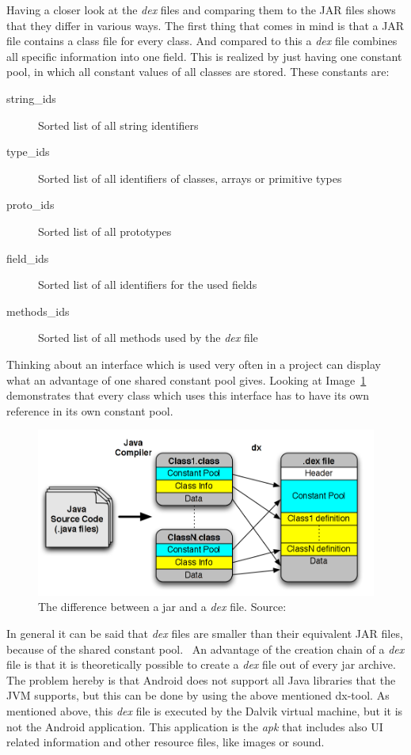 Having a closer look at the \textit{dex} files and comparing them to the JAR files shows that they differ in various ways.
The first thing that comes in mind is that a JAR file contains a class file for every class.
And compared to this a \textit{dex} file combines all specific information into one field.
This is realized by just having one constant pool, in which all constant values of all classes are stored.
These constants are:
\begin{description}
  \item[string\_ids] Sorted list of all string identifiers
  \item[type\_ids] Sorted list of all identifiers of classes, arrays or primitive types
  \item[proto\_ids] Sorted list of all prototypes
  \item[field\_ids] Sorted list of all identifiers for the used fields
  \item[methods\_ids] Sorted list of all methods used by the \textit{dex} file
\end{description}
Thinking about an interface which is used very often in a project can display what an advantage of one shared constant pool gives.
Looking at Image~\ref{fig:jar-dex} demonstrates that every class which uses this interface has to have its own reference in its own constant pool.
\begin{figure}[h]
\begin{center}
\includegraphics[scale=0.41]{images/jar-dex.png} 
\caption{The difference between a jar and a \textit{dex} file. Source:~\cite{enck2011study}}
\label{fig:jar-dex}
\end{center}
\end{figure}

In general it can be said that \textit{dex} files are smaller than their equivalent JAR files, because of the shared constant pool.~\cite{bornstein2008dalvik}
An advantage of the creation chain of a \textit{dex} file is that it is theoretically possible to create a \textit{dex} file out of every jar archive.
The problem hereby is that Android does not support all Java libraries that the JVM supports, but this can be done by using the above mentioned dx-tool. 
As mentioned above, this \textit{dex} file is executed by the Dalvik virtual machine, but it is not the Android application.
This application is the \textit{apk} that includes also UI related information and other resource files, like images or sound.

